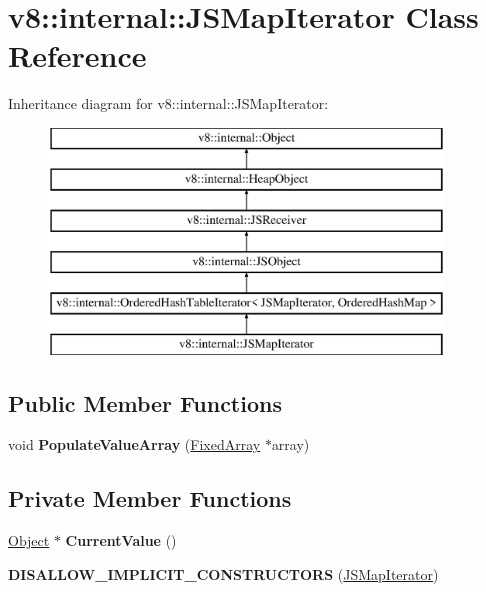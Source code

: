 \hypertarget{classv8_1_1internal_1_1_j_s_map_iterator}{}\section{v8\+:\+:internal\+:\+:J\+S\+Map\+Iterator Class Reference}
\label{classv8_1_1internal_1_1_j_s_map_iterator}
Inheritance diagram for v8\+:\+:internal\+:\+:J\+S\+Map\+Iterator\+:\begin{figure}[H]
\begin{center}
\leavevmode
\includegraphics[height=6.000000cm]{classv8_1_1internal_1_1_j_s_map_iterator}
\end{center}
\end{figure}
\subsection*{Public Member Functions}
\begin{DoxyCompactItemize}
\item 
void {\bfseries Populate\+Value\+Array} (\hyperlink{classv8_1_1internal_1_1_fixed_array}{Fixed\+Array} $\ast$array)\hypertarget{classv8_1_1internal_1_1_j_s_map_iterator_af507046b68167669ba9f097571987229}{}\label{classv8_1_1internal_1_1_j_s_map_iterator_af507046b68167669ba9f097571987229}

\end{DoxyCompactItemize}
\subsection*{Private Member Functions}
\begin{DoxyCompactItemize}
\item 
\hyperlink{classv8_1_1internal_1_1_object}{Object} $\ast$ {\bfseries Current\+Value} ()\hypertarget{classv8_1_1internal_1_1_j_s_map_iterator_a8087d385de3547ffb88bfd91786630c7}{}\label{classv8_1_1internal_1_1_j_s_map_iterator_a8087d385de3547ffb88bfd91786630c7}

\item 
{\bfseries D\+I\+S\+A\+L\+L\+O\+W\+\_\+\+I\+M\+P\+L\+I\+C\+I\+T\+\_\+\+C\+O\+N\+S\+T\+R\+U\+C\+T\+O\+RS} (\hyperlink{classv8_1_1internal_1_1_j_s_map_iterator}{J\+S\+Map\+Iterator})\hypertarget{classv8_1_1internal_1_1_j_s_map_iterator_a2b72be5a748ab4dbdce3a77b8310d39c}{}\label{classv8_1_1internal_1_1_j_s_map_iterator_a2b72be5a748ab4dbdce3a77b8310d39c}

\end{DoxyCompactItemize}
